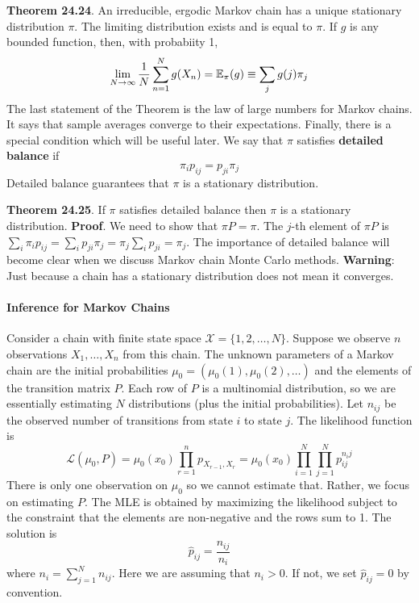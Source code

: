 \textbf{Theorem 24.24}. An irreducible, ergodic Markov chain has a
unique stationary distribution \(\pi\). The limiting distribution exists
and is equal to \(\pi\). If \(g\) is any bounded function, then, with
probabiity 1,
\[
\lim_{N \rightarrow \infty} \frac{1}{N} \sum_{n=1}^N g(X_{n}) = \operatorname{\mathbb{E}}_\pi(g) \equiv \sum_{j} g(j) \pi_{j}
\]
The last statement of the Theorem is the law of large numbers for Markov
chains. It says that sample averages converge to their expectations.
Finally, there is a special condition which will be useful later. We say
that \(\pi\) satisfies \textbf{detailed balance} if
\[
\pi_{i} p_{ij} = p_{ji} \pi_{j}
\]
Detailed balance guarantees that \(\pi\) is a stationary distribution.

\textbf{Theorem 24.25}. If \(\pi\) satisfies detailed balance then
\(\pi\) is a stationary distribution.
\textbf{Proof}. We need to show that \(\pi P = \pi\). The \(j\)-th
element of \(\pi P\) is
\(\sum_{i} \pi_{i} p_{ij} = \sum_{i} p_{ji}\pi_{j} = \pi_{j} \sum_{i} p_{ji} = \pi_{j}\).
The importance of detailed balance will become clear when we discuss
Markov chain Monte Carlo methods.
\textbf{Warning}: Just because a chain has a stationary distribution
does not mean it converges.
\paragraph{Inference for Markov Chains}\label{inference-for-markov-chains}
Consider a chain with finite state space $\mathcal{X} = \{ 1, 2, \dots,
N \} $. Suppose we observe \(n\) observations \(X_{1}, \dots, X_{n}\) from
this chain. The unknown parameters of a Markov chain are the initial
probabilities \(\mu_{0} = (\mu_{0}(1), \mu_{0}(2), \dots)\) and the elements
of the transition matrix \(P\). Each row of \(P\) is a multinomial
distribution, so we are essentially estimating \(N\) distributions (plus
the initial probabilities). Let \(n_{ij}\) be the observed number of
transitions from state \(i\) to state \(j\). The likelihood function is
\[
\mathcal{L}(\mu_{0}, P) = \mu_{0}(x_{0}) \prod_{r=1}^{n} p_{X_{r - 1}, X_r} = \mu_{0}(x_{0}) \prod_{i=1}^N \prod_{j=1}^N p_{ij}^{n_{i}j}
\]
There is only one observation on \(\mu_{0}\) so we cannot estimate that.
Rather, we focus on estimating \(P\). The MLE is obtained by maximizing
the likelihood subject to the constraint that the elements are
non-negative and the rows sum to 1. The solution is
\[
\hat{p}_{ij} = \frac{n_{ij}}{n_{i}}
\]
where \(n_{i} = \sum_{j=1}^N n_{ij}\). Here we are assuming that
\(n_{i} > 0\). If not, we set \(\hat{p}_{ij} = 0\) by convention.

